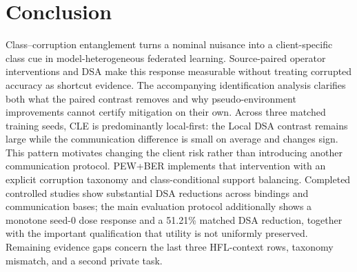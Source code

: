 \section{Conclusion}

Class--corruption entanglement turns a nominal nuisance into a client-specific class cue in model-heterogeneous federated learning. Source-paired operator interventions and DSA make this response measurable without treating corrupted accuracy as shortcut evidence. The accompanying identification analysis clarifies both what the paired contrast removes and why pseudo-environment improvements cannot certify mitigation on their own. Across three matched training seeds, CLE is predominantly local-first: the Local DSA contrast remains large while the communication difference is small on average and changes sign. This pattern motivates changing the client risk rather than introducing another communication protocol. PEW+BER implements that intervention with an explicit corruption taxonomy and class-conditional support balancing. Completed controlled studies show substantial DSA reductions across bindings and communication bases; the main evaluation protocol additionally shows a monotone seed-0 dose response and a 51.21\% matched DSA reduction, together with the important qualification that utility is not uniformly preserved. Remaining evidence gaps concern the last three HFL-context rows, taxonomy mismatch, and a second private task.
